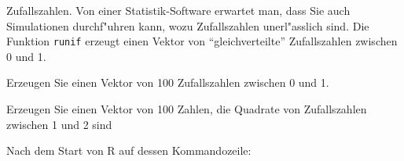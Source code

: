 Zufallszahlen. Von einer Statistik-Software erwartet man, dass Sie auch
Simulationen durchf"uhren kann, wozu Zufallszahlen unerl"asslich sind.
Die Funktion {\tt runif} erzeugt einen Vektor von ``gleichverteilte''
Zufallszahlen zwischen 0 und 1.
\begin{teilaufgaben}
\item Erzeugen Sie einen Vektor von 100 Zufallszahlen zwischen 0 und 1.
\item Erzeugen Sie einen Vektor von 100 Zahlen, die Quadrate
von Zufallszahlen zwischen 1 und 2 sind
\end{teilaufgaben}

\begin{loesung}
Nach dem Start von R auf dessen Kommandozeile:
\end{loesung}

